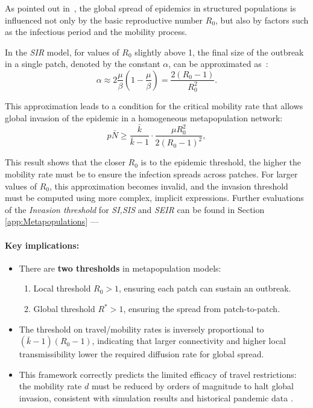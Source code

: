 As pointed out in~\cite{cross2007}, the global spread of epidemics in structured populations is influenced not only by the basic reproductive number \( R_0 \), but also by factors such as the infectious period and the mobility process.

In the \textit{SIR} model, for values of \( R_0 \) slightly above 1, the final size of the outbreak in a single patch, denoted by the constant \( \alpha \), can be approximated as~\cite{murray2005}:
\[
\alpha  \approx 2 \frac{\mu}{\beta}\left( 1-\frac{\mu}{\beta}\right) = \frac{2(R_0 - 1)}{R_0^2}.
\]

This approximation leads to a condition for the critical mobility rate that allows global invasion of the epidemic in a homogeneous metapopulation network:
\begin{equation}
p\bar{N} \geq \frac{ \bar{k}}{\bar{k} - 1} \cdot \frac{\mu R_0^2}{2(R_0 - 1)^2},
\end{equation}

This result shows that the closer \( R_0 \) is to the epidemic threshold, the higher the mobility rate must be to ensure the infection spreads across patches. For larger values of \( R_0 \), this approximation becomes invalid, and the invasion threshold must be computed using more complex, implicit expressions.
Further evaluations of the \textit{Invasion threshold} for \textit{SI,SIS} and \textit{SEIR} can be found in Section \ref{app:Metapopulations}
---

\paragraph{Key implications:}

\begin{itemize}
    \item There are \textbf{two thresholds} in metapopulation models:
    \begin{enumerate}
        \item   Local threshold \(R_0 > 1\), ensuring each patch can sustain an outbreak.
        \item   Global threshold \(R^* > 1\), ensuring the spread from patch-to-patch.
    \end{enumerate}
    \item  The threshold on travel/mobility rates is inversely proportional to \((\bar{k} - 1)(R_0 - 1)\), indicating that larger connectivity and higher local transmissibility lower the required diffusion rate for global spread.
    \item  This framework correctly predicts the limited efficacy of travel restrictions: the mobility rate \(d\) must be reduced by orders of magnitude to halt global invasion, consistent with simulation results and historical pandemic data \cite{colizza2007invasion,colizza2008}.
\end{itemize}




\newpage